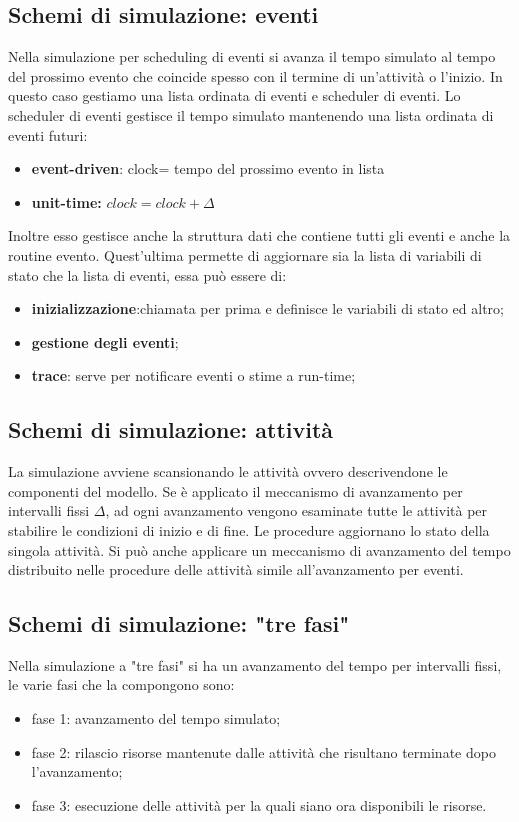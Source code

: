 \subsection{Schemi di simulazione: eventi}
Nella simulazione per scheduling di eventi si avanza il tempo simulato al tempo del prossimo evento che coincide spesso con il termine di un'attività o l'inizio. In questo caso gestiamo una lista ordinata di eventi e scheduler di eventi. Lo scheduler di eventi gestisce il tempo simulato mantenendo una lista ordinata di eventi futuri:
\begin{itemize}
    \item \textbf{event-driven}: clock= tempo del prossimo evento in lista
    \item \textbf{unit-time:} $clock= clock + \Delta$
\end{itemize}
Inoltre esso gestisce anche la struttura dati che contiene tutti gli eventi e anche la routine evento.
Quest'ultima permette di aggiornare sia la lista di variabili di stato che la lista di eventi, essa può essere di:
\begin{itemize}
    \item \textbf{inizializzazione}:chiamata per prima e definisce le variabili di stato ed altro;
    \item \textbf{gestione degli eventi};
    \item \textbf{ trace}: serve per notificare eventi o stime a run-time;
\end{itemize}


\subsection{Schemi di simulazione: attività}
La simulazione avviene scansionando le attività ovvero descrivendone le componenti del modello. Se è applicato il meccanismo di avanzamento per intervalli fissi $\Delta$, ad ogni avanzamento vengono esaminate tutte le attività per stabilire le condizioni di inizio e di fine. Le procedure aggiornano lo stato della singola attività. Si può anche applicare un meccanismo di avanzamento del tempo distribuito nelle procedure delle attività simile all'avanzamento per eventi.

\subsection{Schemi di simulazione: "tre fasi"}
Nella simulazione a "tre fasi" si ha un avanzamento del tempo per intervalli fissi, le varie fasi che la compongono sono:
\begin{itemize}
    \item  fase 1: avanzamento del tempo simulato;
    \item fase 2: rilascio risorse mantenute dalle attività che risultano terminate dopo l'avanzamento;
    \item fase 3: esecuzione delle attività per la quali siano ora disponibili le risorse.
\end{itemize}

